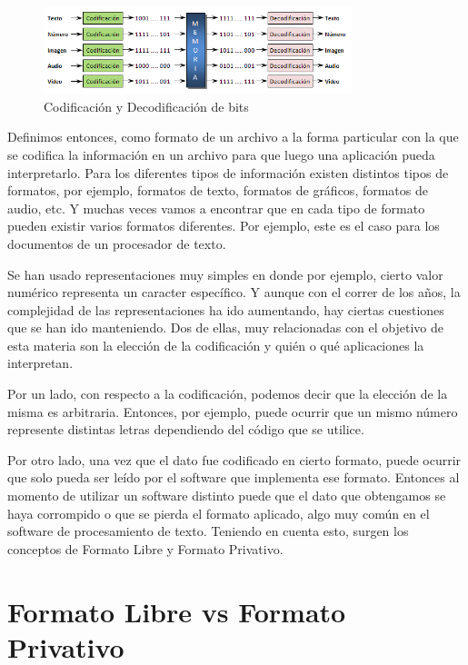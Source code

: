 \documentclass[12pt]{article}
\begin{document}
\begin{figure}[h]
\centering
\includegraphics[width=0.8\textwidth]{patrones_bits.png}
\renewcommand{\figurename}{Fig.}
\caption{Codificación y Decodificación de bits\footnotemark}
\label{contexto:figura}
\end{figure}

Definimos entonces, como formato de un archivo a la forma particular con la que se codifica la información en un archivo para que luego una aplicación pueda interpretarlo. Para los diferentes tipos de información existen distintos tipos de formatos, por ejemplo, formatos de texto, formatos de gráficos, formatos de audio, etc. Y muchas veces vamos a encontrar que en cada tipo de formato pueden existir varios formatos diferentes. Por ejemplo, este es el caso para los documentos de un procesador de texto.

Se han usado representaciones muy simples en donde por ejemplo, cierto valor numérico representa un caracter específico. Y aunque con el correr de los años, la complejidad de las representaciones ha ido aumentando, hay ciertas cuestiones que se han ido manteniendo. Dos de ellas, muy relacionadas con el objetivo de esta materia son la elección de la codificación y quién o qué aplicaciones la interpretan. 

Por un lado, con respecto a la codificación, podemos decir que la elección de la misma es arbitraria. Entonces, por ejemplo, puede ocurrir que un mismo número represente distintas letras dependiendo del código que se utilice. 

Por otro lado, una vez que el dato fue codificado en cierto formato, puede ocurrir que solo pueda ser leído por el software que implementa ese formato. Entonces al momento de utilizar un software distinto puede que el dato que obtengamos se haya corrompido o que se pierda el formato aplicado, algo muy común en el software de procesamiento de texto. Teniendo en cuenta esto, surgen los conceptos de Formato Libre y Formato Privativo.

\section*{Formato Libre vs Formato Privativo}
\end{document}
